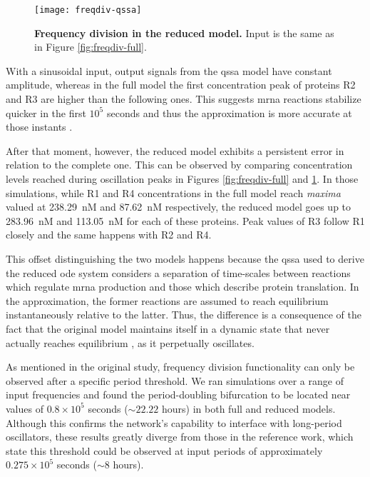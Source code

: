     \begin{figure}[!htbp]
      \centering
      \texttt{[image: freqdiv-qssa]}
      \caption{\textbf{Frequency division in the reduced model.} Input is the same as in Figure \ref{fig:freqdiv-full}.}
      \label{fig:freqdiv-qssa}
    \end{figure}

    With a sinusoidal input, output signals from the \ac{qssa} model have constant amplitude, whereas in the full model the first concentration peak of proteins R2 and R3 are higher than the following ones.
    This suggests \acs{mrna} reactions stabilize quicker in the first $10^5$ seconds and thus the approximation is more accurate at those instants \cite{ingalls}.

    After that moment, however, the reduced model exhibits a persistent error in relation to the complete one.
    This can be observed by comparing concentration levels reached during oscillation peaks in Figures \ref{fig:freqdiv-full} and \ref{fig:freqdiv-qssa}.
    In those simulations, while R1 and R4 concentrations in the full model reach \textit{maxima} valued at \SI{238.29}{\nano M} and \SI{87.62}{\nano M} respectively, the reduced model goes up to \SI{283.96}{\nano M} and \SI{113.05}{\nano M} for each of these proteins.
    Peak values of R3 follow R1 closely and the same happens with R2 and R4.

    This offset distinguishing the two models happens because the \ac{qssa} used to derive the reduced \ac{ode} system considers a separation of time-scales between reactions which regulate \acs{mrna} production and those which describe protein translation.
    In the approximation, the former reactions are assumed to reach equilibrium instantaneously relative to the latter.
    Thus, the difference is a consequence of the fact that the original model maintains itself in a dynamic state that never actually reaches equilibrium \cite{ingalls}, as it perpetually oscillates.

    As mentioned in the original study, frequency division functionality can only be observed after a specific period threshold.
    We ran simulations over a range of input frequencies and found the period-doubling bifurcation to be located near values of $0.8 \times 10^5$ seconds ($\sim 22.22$ hours) in both full and reduced models.
    Although this confirms the network's capability to interface with long-period oscillators, these results greatly diverge from those in the reference work, which state this threshold could be observed at input periods of approximately $0.275 \times 10^5$ seconds ($\sim 8$ hours). %

